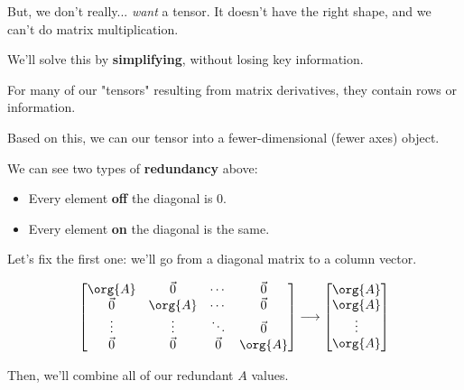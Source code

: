         \subsecdiv
        
        But, we don't really... \textit{want} a tensor. It doesn't have the right shape, and we can't do matrix multiplication.
        
        We'll solve this by \textbf{simplifying}, without losing key information.\\

        \begin{concept}
            For many of our "tensors" resulting from matrix derivatives, they contain  rows or  information. 
            
            Based on this, we can  our tensor into a fewer-dimensional (fewer axes) object.
        \end{concept}
        
        We can see two types of \textbf{redundancy} above:
        
        \begin{itemize}
            \item Every element \textbf{off} the diagonal is 0.
            \item Every element \textbf{on} the diagonal is the same.
        \end{itemize}
        
        Let's fix the first one: we'll go from a diagonal matrix to a column vector.
        
        \begin{equation}
            \begin{bmatrix}
                \org{A} & \vec{0} & \cdots  & \vec{0} \\
                \vec{0} & \org{A} & \cdots  & \vec{0} \\
                \vdots  & \vdots  & \ddots  & \vec{0} \\
                \vec{0} & \vec{0} & \vec{0} & \org{A}
            \end{bmatrix}
            \longrightarrow
            \begin{bmatrix}
                \org{A} \\ \org{A} \\ \vdots \\ \org{A} 
            \end{bmatrix}
        \end{equation}
        
        Then, we'll combine all of our redundant $A$ values.
        
